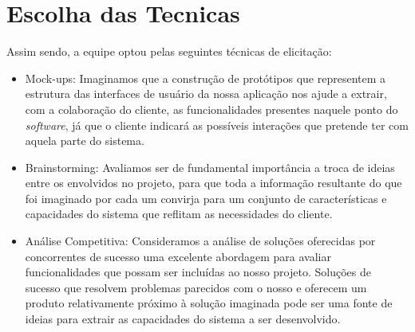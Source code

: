 \section{Escolha das Tecnicas}
Assim sendo, a equipe optou pelas seguintes técnicas de elicitação:
\begin{itemize}
  \item Mock-ups: Imaginamos que a construção de protótipos que representem a estrutura das interfaces de usuário da nossa aplicação nos ajude a extrair, com a colaboração do cliente, as funcionalidades presentes naquele ponto do \emph{software}, já que o cliente indicará as possíveis interações que pretende ter com aquela parte do sistema.

  \item Brainstorming: Avaliamos ser de fundamental importância a troca de ideias entre os envolvidos no projeto, para que toda a informação resultante do que foi imaginado por cada um convirja para um conjunto de características e capacidades do sistema que reflitam as necessidades do cliente.

  \item Análise Competitiva: Consideramos a análise de soluções oferecidas por concorrentes de sucesso uma excelente abordagem para avaliar funcionalidades que possam ser incluídas ao nosso projeto. Soluções de sucesso que resolvem problemas parecidos com o nosso e oferecem um produto relativamente próximo à solução imaginada pode ser uma fonte de ideias para extrair as capacidades do sistema a ser desenvolvido.
\end{itemize}

